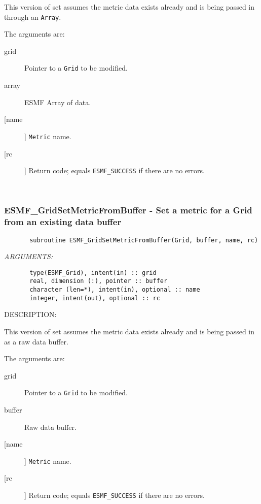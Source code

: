       This version of set assumes the metric data exists already and is being
       passed in through an {\tt Array}.
  
       The arguments are:
       \begin{description}
       \item[grid]
            Pointer to a {\tt Grid} to be modified.
       \item[array]
            ESMF Array of data.
       \item [[name]]
             {\tt Metric} name.
       \item[[rc]]
            Return code; equals {\tt ESMF\_SUCCESS} if there are no errors.
       \end{description}
   
 
\mbox{}\hrulefill\ 
 
\subsubsection{ESMF\_GridSetMetricFromBuffer - Set a metric for a Grid from an existing data buffer}


 
\begin{verbatim}       subroutine ESMF_GridSetMetricFromBuffer(Grid, buffer, name, rc)\end{verbatim}{\em ARGUMENTS:}
\begin{verbatim}       type(ESMF_Grid), intent(in) :: grid
       real, dimension (:), pointer :: buffer
       character (len=*), intent(in), optional :: name
       integer, intent(out), optional :: rc\end{verbatim}
{\sf DESCRIPTION:\\ }


       This version of set assumes the metric data exists already and is being
       passed in as a raw data buffer.
  
       The arguments are:
       \begin{description}
       \item[grid]
            Pointer to a {\tt Grid} to be modified.
       \item[buffer]
            Raw data buffer.
       \item [[name]]
             {\tt Metric} name.
       \item[[rc]]
            Return code; equals {\tt ESMF\_SUCCESS} if there are no errors.
       \end{description}
   

